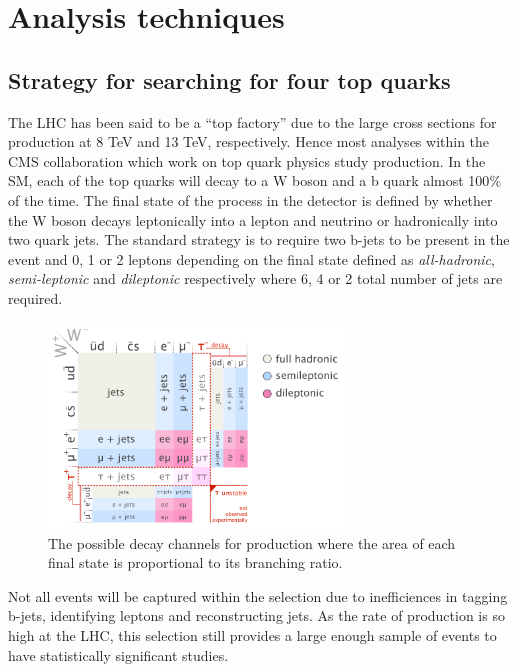 \chapter{Analysis techniques}
\section{Strategy for searching for four top quarks \label{sec:Strategy}}

The LHC has been said to be a ``top factory'' due to the large cross sections for \ttbar production at 8 TeV and 13 TeV,  respectively. Hence most analyses within the CMS collaboration which work on top quark physics study \ttbar production. In the SM, each of the top quarks will decay to a W boson and a b quark almost 100$\%$ of the time. The final state of the \ttbar process in the detector is defined by whether the W boson decays leptonically into a lepton and neutrino or hadronically into two quark jets. The standard strategy is to require two b-jets to be present in the event and 0, 1 or 2 leptons depending on the final state defined as \emph{all-hadronic}, \emph{semi-leptonic} and \emph{dileptonic} respectively where 6, 4 or 2 total number of jets are required. 

\begin{figure}[ht!]
\centering
    \includegraphics[width=0.7\textwidth]{images/Analysis/Ttbar_decay_channels.png}
    \caption{The possible decay channels for \ttbar production where the area of each final state is proportional to its branching ratio.}
    \label{fig:ttbarDecay}
\end{figure}

Not all \ttbar events will be captured within the selection due to inefficiences in tagging b-jets, identifying leptons and reconstructing jets. As the rate of \ttbar production is so high at the LHC, this selection still provides a large enough sample of events to have statistically significant studies.\\

